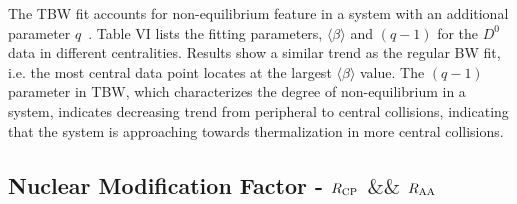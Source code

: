 \documentclass[%
 reprint,	
 amsmath,amssymb,
 aps,
 prc,
]{revtex4-1}
\begin{document}
The TBW fit accounts for non-equilibrium feature in a system with an additional parameter $q$~\cite{Tang:2008ud}. %
Table VI lists the fitting parameters, $\langle\beta\rangle$ and $(q-1)$ for the $D^0$ data in different centralities. Results show a similar trend as the regular BW fit, i.e. the most central data point locates at the largest $\langle\beta\rangle$ value. The $(q-1)$ parameter in TBW, which characterizes the degree of non-equilibrium in a system, indicates decreasing trend from peripheral to central collisions, indicating that the system is approaching towards thermalization in more central collisions.

\begin{table}[t]
\label{table:TBW_fit}
\end{table}

\subsection{\label{result:RCP}Nuclear Modification Factor - $R_{\rm CP}$ $\&\&$  $R_{\rm AA}$}
\end{document}
